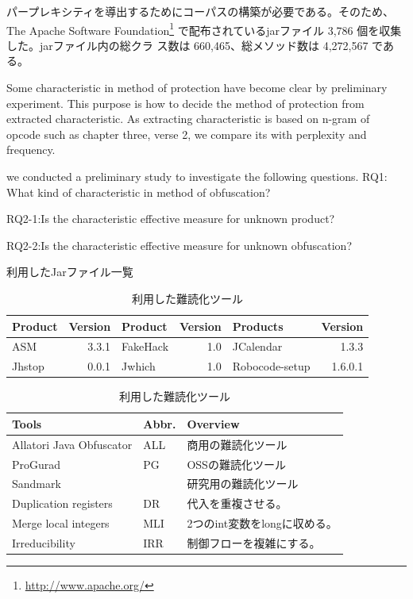 \documentclass[conference]{IEEEtran}
\begin{document}
パープレキシティを導出するためにコーパスの構築が必要である。そのため、
The Apache Software Foundation\footnote{\url{http://www.apache.org/}}
で配布されているjarファイル 3,786 個を収集した。jarファイル内の総クラ
ス数は 660,465、総メソッド数は 4,272,567 である。

Some characteristic in method of protection have become clear by preliminary experiment.
This purpose is how to decide the method of protection from extracted characteristic.
As extracting characteristic is based on n-gram of opcode such as 
chapter three, verse 2, 
we compare its with perplexity and frequency.

we conducted a preliminary study to investigate the following questions.
RQ1: What kind of characteristic in method of obfuscation? 

RQ2-1:Is the characteristic effective measure for unknown product?

RQ2-2:Is the characteristic effective measure for unknown obfuscation?

\begin{table}[t]
  \centering
  \footnotesize{
    \caption{利用したJarファイル一覧}\label{table:jars}
  \begin{tabular}{l|r||l|r||l|r}
    Product & Version & Product & Version & Products & Version \\ \hline
    ASM       & 3.3.1 & FakeHack  & 1.0 &JCalendar & 1.3.3   \\
    Jhstop    & 0.0.1 & Jwhich    & 1.0   & Robocode-setup & 1.6.0.1 
  \end{tabular}
  \caption{利用した難読化ツール}\label{table:tools}
  \begin{tabular}{ll|l}
      Tools & Abbr. & Overview \\ \hline
      Allatori Java Obfuscator & ALL & 商用の難読化ツール \\ \hline
      ProGurad                 & PG & OSSの難読化ツール \\ \hline
      Sandmark                 & & 研究用の難読化ツール \\
      \hspace{0.2cm} Duplication registers & DR & 代入を重複させる。\\
      \hspace{0.2cm} Merge local integers & MLI & 2つのint変数をlongに収める。\\
      \hspace{0.2cm} Irreducibility       & IRR & 制御フローを複雑にする。\\
  \end{tabular}}
\end{table}
\end{document}
